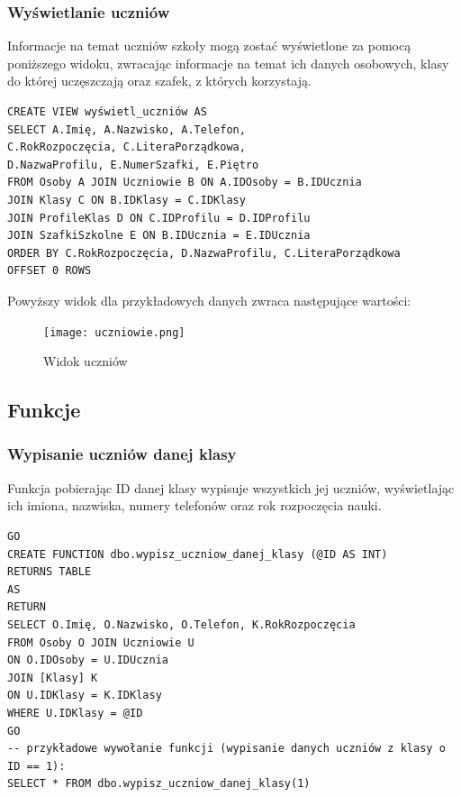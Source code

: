 \documentclass[60pt]{article}
\begin{document}
\subsubsection{Wyświetlanie uczniów}

Informacje na temat uczniów szkoły mogą zostać wyświetlone za pomocą poniższego widoku, zwracając informacje na temat ich danych osobowych, klasy do której uczęszczają oraz szafek, z których korzystają.

\begin{verbatim}
CREATE VIEW wyświetl_uczniów AS
SELECT A.Imię, A.Nazwisko, A.Telefon, 
C.RokRozpoczęcia, C.LiteraPorządkowa, 
D.NazwaProfilu, E.NumerSzafki, E.Piętro
FROM Osoby A JOIN Uczniowie B ON A.IDOsoby = B.IDUcznia
JOIN Klasy C ON B.IDKlasy = C.IDKlasy
JOIN ProfileKlas D ON C.IDProfilu = D.IDProfilu
JOIN SzafkiSzkolne E ON B.IDUcznia = E.IDUcznia
ORDER BY C.RokRozpoczęcia, D.NazwaProfilu, C.LiteraPorządkowa
OFFSET 0 ROWS
\end{verbatim}

Powyższy widok dla przykładowych danych zwraca następujące wartości:

\begin{figure}[h]
  \texttt{[image: uczniowie.png]}
  \caption{Widok uczniów}
  \label{Widok uczniów}
\end{figure}

\subsection{Funkcje}

\subsubsection{Wypisanie uczniów danej klasy}

Funkcja pobierając ID danej klasy wypisuje wszystkich jej uczniów, wyświetlając ich imiona, nazwiska, numery telefonów oraz rok rozpoczęcia nauki. 

\begin{verbatim}
GO
CREATE FUNCTION dbo.wypisz_uczniow_danej_klasy (@ID AS INT)
RETURNS TABLE
AS
RETURN
SELECT O.Imię, O.Nazwisko, O.Telefon, K.RokRozpoczęcia
FROM Osoby O JOIN Uczniowie U
ON O.IDOsoby = U.IDUcznia
JOIN [Klasy] K
ON U.IDKlasy = K.IDKlasy
WHERE U.IDKlasy = @ID
GO
-- przykładowe wywołanie funkcji (wypisanie danych uczniów z klasy o ID == 1):
SELECT * FROM dbo.wypisz_uczniow_danej_klasy(1)
\end{verbatim}
\end{document}
